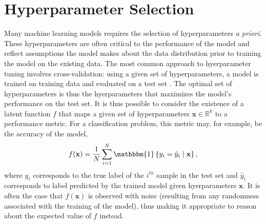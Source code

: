 \documentclass{article}
\newcommand{\R}{\mathbb{R}}
\newcommand{\x}{\mathbf{x}}
\newcommand{\set}[1]{\left\{{#1}\right\}}
\begin{document}
\section{Hyperparameter Selection}
Many machine learning models requires the selection of hyperparameters \emph{a priori}. These hyperparameters are often critical to the performance of the model \cite{adams:prior} and reflect assumptions the model makes about the data distribution prior to training the model on the existing data. The most common approach to hyerparameter tuning involves cross-validation: using a given set of hyperparameters, a model is trained on training data and evaluated on a test set \cite{bengio}. The optimal set of hyperparameters is thus the hyerparameters that maximizes the model's performance on the test set. It is thus possible to consider the existence of a latent function $f$ that maps a given set of hyperparameters $\x \in \R^k$ to a performance metric. For a classification problem, this metric may, for example, be the accuracy of the model,
\begin{align}
  f(\x) = \frac{1}{N} \sum_{i=1}^N \mathbbm{1}\set{y_i = \hat{y}_i \mid \x},
\end{align}
where $y_i$ corresponds to the true label of the $i^{th}$ sample in the test set and $\hat{y}_i$ corresponds to label predicted by the trained model given hyerparameters $\x$. It is often the case that $f(\x)$ is observed with noise (resulting from any randomness associated with the training of the model), thus making it appropriate to reason about the expected value of $f$ instead.
\end{document}
